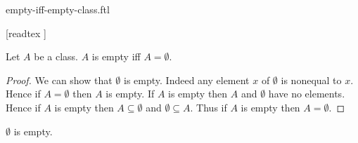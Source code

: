 \documentclass{stex}
\begin{document}
\begin{smodule}{empty-iff-empty-class.ftl}

  \begin{forthel}

    [readtex ]
  \end{forthel}

  \begin{forthel}
    \begin{proposition}
      Let $A$ be a class.
      $A$ is empty iff $A = \emptyset$.
    \end{proposition}
    \begin{proof}
      We can show that $\emptyset$ is empty.
      Indeed any element $x$ of $\emptyset$ is nonequal to $x$.
      Hence if $A = \emptyset$ then $A$ is empty.
      If $A$ is empty then $A$ and $\emptyset$ have no elements.
      Hence if $A$ is empty then $A \subseteq \emptyset$ and
      $\emptyset \subseteq A$.
      Thus if $A$ is empty then $A = \emptyset$.
    \end{proof}
  \end{forthel}

  \begin{forthel}
    \begin{corollary}
      $\emptyset$ is empty.
    \end{corollary}
  \end{forthel}
\end{smodule}
\end{document}
